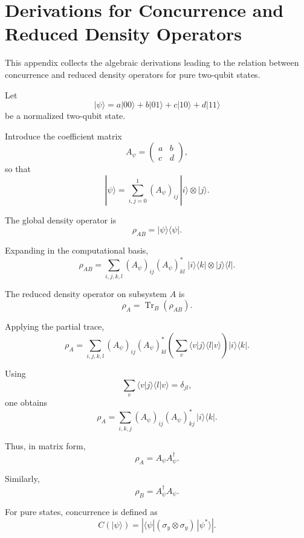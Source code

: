 \documentclass[a4paper]{article}
\begin{document}

\section{Derivations for Concurrence and Reduced Density Operators}

This appendix collects the algebraic derivations leading to the relation between concurrence and reduced density operators for pure two-qubit states.

Let
\[
|\psi\rangle
=
a|00\rangle + b|01\rangle + c|10\rangle + d|11\rangle
\]
be a normalized two-qubit state.

Introduce the coefficient matrix
\[
A_\psi =
\begin{pmatrix}
a & b\\
c & d
\end{pmatrix},
\]
so that
\[
|\psi\rangle
=
\sum_{i,j=0}^{1} (A_\psi)_{ij}\,|i\rangle \otimes |j\rangle.
\]


The global density operator is
\[
\rho_{AB} = |\psi\rangle\langle\psi|.
\]

Expanding in the computational basis,
\[
\rho_{AB}
=
\sum_{i,j,k,l}
(A_\psi)_{ij}(A_\psi)^*_{kl}
\;
|i\rangle\langle k|
\otimes
|j\rangle\langle l|.
\]

The reduced density operator on subsystem \(A\) is
\[
\rho_A = \operatorname{Tr}_B(\rho_{AB}).
\]

Applying the partial trace,
\[
\rho_A
=
\sum_{i,j,k,l}
(A_\psi)_{ij}(A_\psi)^*_{kl}
\left(
\sum_v \langle v|j\rangle \langle l|v\rangle
\right)
|i\rangle\langle k|.
\]

Using
\[
\sum_v \langle v|j\rangle \langle l|v\rangle = \delta_{jl},
\]
one obtains
\[
\rho_A
=
\sum_{i,k,j}
(A_\psi)_{ij}(A_\psi)^*_{kj}
\,|i\rangle\langle k|.
\]

Thus, in matrix form,
\[
\rho_A = A_\psi A_\psi^\dagger.
\]

Similarly,
\[
\rho_B = A_\psi^\dagger A_\psi.
\]

For pure states, concurrence is defined as
\[
C(|\psi\rangle)
=
\left|
\langle \psi | (\sigma_y \otimes \sigma_y)\,|\psi^*\rangle
\right|.
\]
\end{document}
